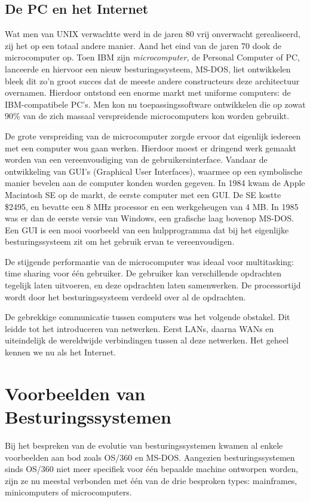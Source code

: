 \subsection{De PC en het Internet}

Wat men van UNIX verwachtte werd in de jaren 80 vrij onverwacht
gerealiseerd, zij het op een totaal andere manier. Aand het eind van
de jaren 70 dook de microcomputer op. Toen IBM zijn
\emph{microcomputer}, de Personal Computer of PC,
lanceerde en hiervoor een nieuw besturingssysteem, MS-DOS, liet
ontwikkelen bleek dit zo'n groot succes dat de meeste andere
constructeurs deze architectuur overnamen. Hierdoor ontstond een
enorme markt met uniforme computers: de IBM-compatibele PC's. Men kon
nu toepassingssoftware ontwikkelen die op zowat 90\% van de zich
massaal verspreidende microcomputers kon worden gebruikt.

De grote verspreiding van de microcomputer zorgde ervoor dat
eigenlijk iedereen met een computer wou gaan werken. Hierdoor moest er
dringend werk gemaakt worden van een vereenvoudiging van de
gebruikersinterface. Vandaar de ontwikkeling van GUI's (Graphical User
Interfaces), waarmee op een symbolische manier bevelen aan de computer
konden worden gegeven. In 1984 kwam de Apple Macintosh SE op de markt,
de eerste computer met een GUI. De SE kostte \$2495, en bevatte een 8
MHz processor en een werkgeheugen van 4 MB. In 1985 was er dan de
eerste versie van Windows, een grafische laag bovenop MS-DOS. Een GUI
is een mooi voorbeeld van een hulpprogramma dat bij het eigenlijke
besturingssysteem zit om het gebruik ervan te vereenvoudigen.

De stijgende performantie van de microcomputer was ideaal voor
multitasking: time sharing voor \'e\'en gebruiker. De gebruiker kan
verschillende opdrachten tegelijk laten uitvoeren, en deze opdrachten
laten samenwerken. De processortijd wordt door het besturingssysteem
verdeeld over al de opdrachten.

De gebrekkige communicatie tussen computers was het volgende
obstakel. Dit leidde tot het introduceren van netwerken. Eerst LANs,
daarna WANs en uiteindelijk de wereldwijde verbindingen tussen al deze
netwerken. Het geheel kennen we nu als het Internet.

\section{Voorbeelden van Besturingssystemen}

Bij het bespreken van de evolutie van besturingssystemen kwamen al
enkele voorbeelden aan bod zoals OS/360 en MS-DOS. Aangezien
besturingssystemen sinds OS/360 niet meer specifiek voor \'e\'en bepaalde
machine ontworpen worden, zijn ze nu meestal verbonden met \'e\'en van de
drie besproken types: mainframes, minicomputers of
microcomputers.

